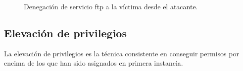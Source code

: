 \documentclass[a4,12pt,onecolum]{article}
\begin{document}
\begin{enumerate}
    \begin{figure}[htbp]
    \centering
    \caption{Denegación de servicio ftp a la víctima desde el atacante.}
    \label{fig:metade1}
    \end{figure}

\end{enumerate}


\clearpage
\subsection{Elevación de privilegios}

La elevación de privilegios es la técnica consistente en conseguir permisos por encima de los que han sido asignados en primera instancia. \\
\end{document}
